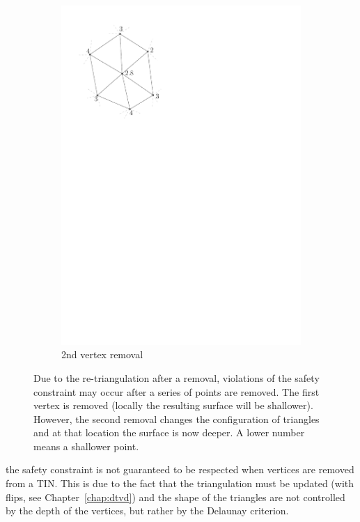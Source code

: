 \begin{figure}
\begin{subfigure}[b]{0.2\linewidth}
    \includegraphics[width=\textwidth,page=3]{figs/simpfail.pdf}
    \caption{2nd vertex removal}\label{fig:simpfail:c}
  \end{subfigure}
\caption{Due to the re-triangulation after a removal, violations of the safety constraint may occur after a series of points are removed. The first vertex is removed (locally the resulting surface will be shallower). However, the second removal changes the configuration of triangles and at that location the surface is now deeper. A lower number means a shallower point.}
\label{fig:simpfail}
\end{figure}
the safety constraint is not guaranteed to be respected when vertices are removed from a TIN.
This is due to the fact that the triangulation must be updated (with flips, see Chapter~\ref{chap:dtvd}) and the shape of the triangles are not controlled by the depth of the vertices, but rather by the Delaunay criterion.


